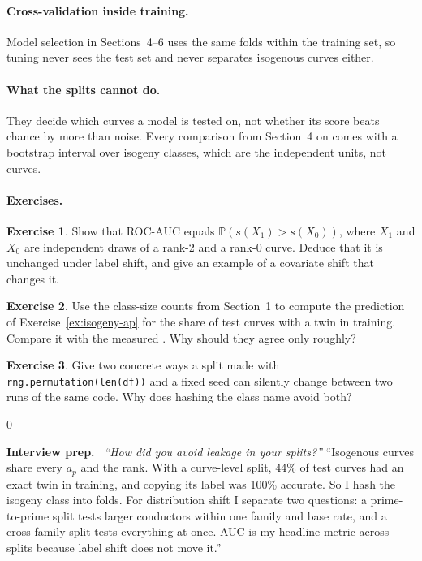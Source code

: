 \documentclass[11pt]{article}
\theoremstyle{definition}
\newtheorem{exercise}{Exercise}[section]
\theoremstyle{plain}
\theoremstyle{remark}
\renewcommand{\P}{\mathbb{P}}
\newcommand{\code}[1]{\texttt{#1}}
\renewcommand{\_}{\oldunderscore\allowbreak}
\newenvironment{interview}
  {\par\medskip\noindent\begin{lrbox}{0}\begin{minipage}{\dimexpr\linewidth-2\fboxsep-2\fboxrule\relax}
   \textbf{Interview prep.}\ }
  {\end{minipage}\end{lrbox}\fcolorbox{blue!40!black}{interviewbg}{\usebox{0}}\par\medskip}
\begin{document}
\paragraph{Cross-validation inside training.}
Model selection in Sections~4--6 uses the same folds within the training set, so tuning never
sees the test set and never separates isogenous curves either.

\paragraph{What the splits cannot do.}
They decide which curves a model is tested on, not whether its score beats chance by more
than noise. Every comparison from Section~4 on comes with a bootstrap interval over isogeny
classes, which are the independent units, not curves.

\paragraph{Exercises.}
\begin{exercise}\label{ex:auc-shift}
Show that ROC-AUC equals $\P(s(X_1)>s(X_0))$, where $X_1$ and $X_0$ are independent draws of a
rank-2 and a rank-0 curve. Deduce that it is unchanged under label shift, and give an example
of a covariate shift that changes it.
\end{exercise}
\begin{exercise}\label{ex:twins}
Use the class-size counts from Section~1 to compute the prediction of
Exercise~\ref{ex:isogeny-ap} for the share of test curves with a twin in training. Compare it
with the measured \CurveSplitMatch. Why should they agree only roughly?
\end{exercise}
\begin{exercise}\label{ex:hash}
Give two concrete ways a split made with \code{rng.permutation(len(df))} and a fixed seed can
silently change between two runs of the same code. Why does hashing the class name avoid
both?
\end{exercise}

\begin{interview}
\emph{``How did you avoid leakage in your splits?''} ``Isogenous curves share every $a_p$
and the rank. With a curve-level split, 44\% of test curves had an exact twin in training,
and copying its label was 100\% accurate. So I hash the isogeny class into folds. For
distribution shift I separate two questions: a prime-to-prime split tests larger conductors
within one family and base rate, and a cross-family split tests everything at once. AUC is my
headline metric across splits because label shift does not move it.''
\end{interview}
\end{document}
